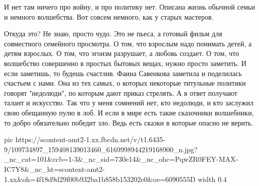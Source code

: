 И нет там ничего про войну, и про политику нет. Описана жизнь обычной семьи и
немного волшебства. Вот совсем немного, как у старых мастеров. 

Откуда это? Не знаю, просто чудо. Это не пьеса, а готовый фильм для совместного
семейного просмотра. О том, что взрослым надо понимать детей, а детям взрослых.
О том, что эгоизм разрушает, а любовь создает. О том, что волшебство совершенно
в простых бытовых вещах, нужно просто заметить. И если заметишь, то будешь
счастлив. Фаина Савенкова заметила и поделилась счастьем с нами. Она из тех
самых, о которых некоторые титульные политики говорят "недолюди", по которым
дают приказ стрелять. А в ответ получают талант и искусство. Так что у меня
сомнений нет, кто недолюди, и кто заслужил свою обещанную пулю в лоб. И если в
мире есть такие сказочники волшебники, то добро обязательно победит зло. Ведь
есть сказки в которые опасно не верить.


\ifcmt
  pic https://scontent-amt2-1.xx.fbcdn.net/v/t1.6435-9/109734897_159408139013460_6169998944219168900_n.jpg?_nc_cat=101&ccb=1-3&_nc_sid=730e14&_nc_ohc=PqwZR0FEY-MAX-IC7Y8&_nc_ht=scontent-amt2-1.xx&oh=4f18d9d29f00b932ba1b858b153202e0&oe=6090555D
  width 0.4
\fi

